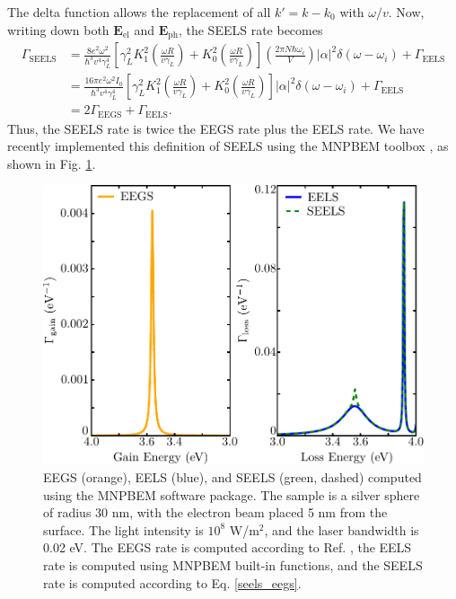 \documentclass [11pt, proquest] {uwthesis}[2016/11/22]
\begin{document}
The delta function allows the replacement of all $k' = k-k_0$ with $\omega/v$. Now, writing down both $\textbf{E}_{\textrm{el}}$ and $\textbf{E}_{\textrm{ph}}$, the SEELS rate becomes
\begin{equation}
\begin{aligned}
\Gamma_{\textrm{SEELS}} &= \frac{8e^2\omega^2}{\hbar^3v^4\gamma_{L}^4}\left[\gamma_{L}^2K_1^2\left(\frac{\omega R}{v\gamma_L}\right)+K_0^2\left(\frac{\omega R}{v\gamma_L}\right)\right]\left(\frac{2\pi N\hbar\omega_i}{V}\right)|\alpha|^2\delta(\omega-\omega_i) + \Gamma_{\textrm{EELS}}\\
& = \frac{16\pi e^2\omega^2 I_0}{\hbar^3v^4\gamma_{L}^4}\left[\gamma_{L}^2K_1^2\left(\frac{\omega R}{v\gamma_L}\right)+K_0^2\left(\frac{\omega R}{v\gamma_L}\right)\right]|\alpha|^2\delta(\omega-\omega_i) + \Gamma_{\textrm{EELS}}\\
& = 2\Gamma_{\textrm{EEGS}} + \Gamma_{\textrm{EELS}}.
\label{seels_eegs}
\end{aligned}
\end{equation}
Thus, the SEELS rate is twice the EEGS rate plus the EELS rate. We have recently implemented this definition of SEELS using the MNPBEM toolbox \cite{Hohenester2012,Hohenester2014}, as shown in Fig. \ref{seels_bem}.

\begin{figure}
\begin{centering}
\includegraphics{seels_eegs_bem.pdf}
\caption{EEGS (orange), EELS (blue), and SEELS (green, dashed) computed using the MNPBEM software package. The sample is a silver sphere of radius 30 nm, with the electron beam placed 5 nm from the surface. The light intensity is $10^8$ W/m$^2$, and the laser bandwidth is 0.02 eV. The EEGS rate is computed according to Ref. \cite{EEGS}, the EELS rate is computed using MNPBEM built-in functions, and the SEELS rate is computed according to Eq. \ref{seels_eegs}.}
\label{seels_bem}
\end{centering}
\end{figure}
\end{document}

